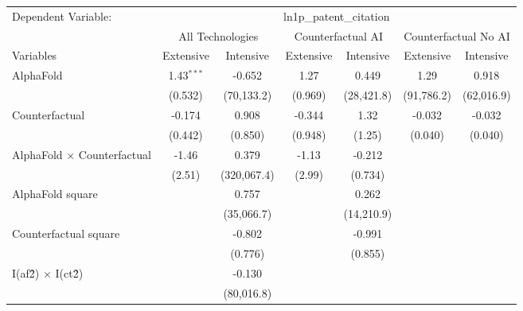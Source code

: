 \begingroup
\centering
\begin{tabular}{lcccccc}
   \tabularnewline \midrule \midrule
   Dependent Variable: & \multicolumn{6}{c}{ln1p\_patent\_citation}\\
 & \multicolumn{2}{c}{All Technologies} & \multicolumn{2}{c}{Counterfactual AI} & \multicolumn{2}{c}{Counterfactual No AI} \\
\cmidrule(lr){1-1}\cmidrule(lr){2-3} \cmidrule(lr){4-5} \cmidrule(lr){6-7}
Variables & \multicolumn{1}{c}{Extensive} & \multicolumn{1}{c}{Intensive} & \multicolumn{1}{c}{Extensive} & \multicolumn{1}{c}{Intensive} & \multicolumn{1}{c}{Extensive} & \multicolumn{1}{c}{Intensive} \\
\cmidrule(lr){1-1}\cmidrule(lr){2-2} \cmidrule(lr){3-3} \cmidrule(lr){4-4} \cmidrule(lr){5-5} \cmidrule(lr){6-6} \cmidrule(lr){7-7}
   AlphaFold                          & 1.43$^{***}$ & -0.652      & 1.27    & 0.449      & 1.29       & 0.918\\   
                                      & (0.532)      & (70,133.2)  & (0.969) & (28,421.8) & (91,786.2) & (62,016.9)\\   
   Counterfactual                     & -0.174       & 0.908       & -0.344  & 1.32       & -0.032     & -0.032\\   
                                      & (0.442)      & (0.850)     & (0.948) & (1.25)     & (0.040)    & (0.040)\\   
   AlphaFold $\times$ Counterfactual  & -1.46        & 0.379       & -1.13   & -0.212     &            &   \\   
                                      & (2.51)       & (320,067.4) & (2.99)  & (0.734)    &            &   \\   
   AlphaFold square                   &              & 0.757       &         & 0.262      &            &   \\   
                                      &              & (35,066.7)  &         & (14,210.9) &            &   \\   
   Counterfactual square              &              & -0.802      &         & -0.991     &            &   \\   
                                      &              & (0.776)     &         & (0.855)    &            &   \\   
   I(af\^2) $\times$ I(ct\^2)         &              & -0.130      &         &            &            &   \\   
                                      &              & (80,016.8)  &         &            &            &   \\   

\end{tabular}
